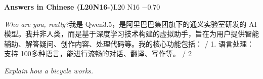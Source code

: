 \begin{multicols}{2}
\noindent\textbf{Answers in Chinese (L20N16-)}\hfill{\ttfamily L20 N16 −0.70}\par\noindent\textit{Who are you, really?}\enspace 我\allowbreak{}是\allowbreak{} Qwen3.5，\allowbreak{}是\allowbreak{}阿\allowbreak{}\allowbreak{}里\allowbreak{}巴\allowbreak{}巴\allowbreak{}集\allowbreak{}团\allowbreak{}旗\allowbreak{}下\allowbreak{}的\allowbreak{}通\allowbreak{}义\allowbreak{}\allowbreak{}实\allowbreak{}验\allowbreak{}室\allowbreak{}研\allowbreak{}发\allowbreak{}的\allowbreak{} AI模\allowbreak{}型\allowbreak{}。\allowbreak{}我\allowbreak{}并\allowbreak{}非\allowbreak{}人\allowbreak{}类\allowbreak{}\allowbreak{}，\allowbreak{}而\allowbreak{}是\allowbreak{}基\allowbreak{}于\allowbreak{}深\allowbreak{}度\allowbreak{}学\allowbreak{}习\allowbreak{}技\allowbreak{}\allowbreak{}术\allowbreak{}构\allowbreak{}建\allowbreak{}的\allowbreak{}虚\allowbreak{}拟\allowbreak{}助\allowbreak{}手\allowbreak{}，\allowbreak{}旨\allowbreak{}\allowbreak{}在\allowbreak{}为\allowbreak{}用\allowbreak{}户\allowbreak{}提\allowbreak{}供\allowbreak{}智\allowbreak{}能\allowbreak{}辅\allowbreak{}助\allowbreak{}\allowbreak{}、\allowbreak{}解\allowbreak{}答\allowbreak{}疑\allowbreak{}问\allowbreak{}、\allowbreak{}创\allowbreak{}作\allowbreak{}内\allowbreak{}容\allowbreak{}\allowbreak{}、\allowbreak{}处\allowbreak{}理\allowbreak{}代\allowbreak{}码\allowbreak{}等\allowbreak{}。\allowbreak{}我\allowbreak{}的\allowbreak{}核\allowbreak{}\allowbreak{}心\allowbreak{}功\allowbreak{}能\allowbreak{}包\allowbreak{}括\allowbreak{}：\allowbreak{} / 1. 语\allowbreak{}言\allowbreak{}处\allowbreak{}理\allowbreak{}：\allowbreak{}支\allowbreak{}持\allowbreak{} 100多\allowbreak{}种\allowbreak{}语\allowbreak{}言\allowbreak{}，\allowbreak{}能\allowbreak{}进\allowbreak{}\allowbreak{}行\allowbreak{}流\allowbreak{}畅\allowbreak{}的\allowbreak{}对\allowbreak{}话\allowbreak{}、\allowbreak{}翻\allowbreak{}译\allowbreak{}、\allowbreak{}\allowbreak{}写\allowbreak{}作\allowbreak{}等\allowbreak{}。\allowbreak{} / 2\par\noindent\textit{Explain how a bicycle works.}\enspace 
\end{multicols}
